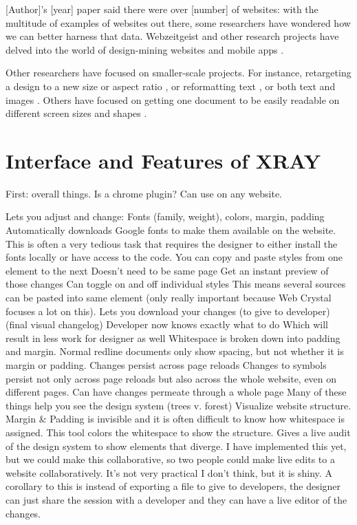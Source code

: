 \documentclass{sigchi}
\begin{document}
[Author]'s [year] paper said there were over [number] of websites: with the multitude of examples of websites out there, some researchers have wondered how we can better harness that data. Webzeitgeist and other research projects have delved into the world of design-mining websites \cite{Webzeitgeist_Kumar_CHI_2013, learning_on_web_design_Satyanarayan_CHI_2012} and mobile apps \cite{mining_mobile_applications_alharbi_phdthesis_2016}. 

Other researchers have focused on smaller-scale projects. For instance, retargeting a design to a new size or aspect ratio \cite{learning_layouts_single_page_design_o_donovan_IEEE_2014}, or reformatting text \cite{review_automatic_docu_formatting_Hurst_DocEng_2009}, or both text and images \cite{probabilistic_auto_document_composition_Damera_Venkata_DocEng_2011}. Others have focused on getting one document to be easily readable on different screen sizes and shapes \cite{adaptiveGridBasedLayout_Jacobs_SIGGRAPH_2003}.

\section{Interface and Features of XRAY}
First: overall things. Is a chrome plugin? Can use on any website. 

Lets you adjust and change: 
Fonts (family, weight), colors, margin, padding
Automatically downloads Google fonts to make them available on the website. This is often a very tedious task that requires the designer to either install the fonts locally or have access to the code.
You can copy and paste styles from one element to the next
Doesn’t need to be same page
Get an instant preview of those changes
Can toggle on and off individual styles 
This means several sources can be pasted into same element (only really important because Web Crystal focuses a lot on this).
Lets you download your changes (to give to developer) (final visual changelog)
Developer now knows exactly what to do
Which will result in less work for designer as well
Whitespace is broken down into padding and margin. Normal redline documents only show spacing, but not whether it is margin or padding.
Changes persist across page reloads 
Changes to symbols persist not only across page reloads but also across the whole website, even on different pages. 
Can have changes permeate through a whole page
Many of these things help you see the design system (trees v. forest) 
Visualize website structure. Margin \& Padding is invisible and it is often difficult to know how whitespace is assigned. This tool colors the whitespace to show the structure.
Gives a live audit of the design system to show elements that diverge. 
I have implemented this yet, but we could make this collaborative, so two people could make live edits to a website collaboratively. It’s not very practical I don’t think, but it is shiny.
A corollary to this is instead of exporting a file to give to developers, the designer can just share the session with a developer and they can have a live editor of the changes.
\end{document}
